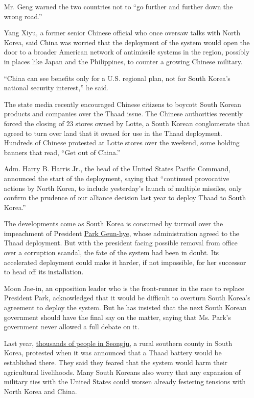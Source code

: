 Mr. Geng warned the two countries not to ``go further and further down
the wrong road.''

Yang Xiyu, a former senior Chinese official who once oversaw talks with
North Korea, said China was worried that the deployment of the system
would open the door to a broader American network of antimissile systems
in the region, possibly in places like Japan and the Philippines, to
counter a growing Chinese military.

``China can see benefits only for a U.S. regional plan, not for South
Korea's national security interest,'' he said.

The state media recently encouraged Chinese citizens to boycott South
Korean products and companies over the Thaad issue. The Chinese
authorities recently forced the closing of 23 stores owned by Lotte, a
South Korean conglomerate that agreed to turn over land that it owned
for use in the Thaad deployment. Hundreds of Chinese protested at Lotte
stores over the weekend, some holding banners that read, ``Get out of
China.''

Adm. Harry B. Harris Jr., the head of the United States Pacific Command,
announced the start of the deployment, saying that ``continued
provocative actions by North Korea, to include yesterday's launch of
multiple missiles, only confirm the prudence of our alliance decision
last year to deploy Thaad to South Korea.''

The developments come as South Korea is consumed by turmoil over the
impeachment of President
\href{http://topics.nytimes3xbfgragh.onion/top/reference/timestopics/people/p/park_geunhye/index.html?inline=nyt-per}{Park
Geun-hye}, whose administration agreed to the Thaad deployment. But with
the president facing possible removal from office over a corruption
scandal, the fate of the system had been in doubt. Its accelerated
deployment could make it harder, if not impossible, for her successor to
head off its installation.

Moon Jae-in, an opposition leader who is the front-runner in the race to
replace President Park, acknowledged that it would be difficult to
overturn South Korea's agreement to deploy the system. But he has
insisted that the next South Korean government should have the final say
on the matter, saying that Ms. Park's government never allowed a full
debate on it.

Last year,
\href{https://www.nytimes3xbfgragh.onion/2016/07/14/world/asia/south-korea-thaad-us.html}{thousands
of people in Seongju}, a rural southern county in South Korea, protested
when it was announced that a Thaad battery would be established there.
They said they feared that the system would harm their agricultural
livelihoods. Many South Koreans also worry that any expansion of
military ties with the United States could worsen already festering
tensions with North Korea and China.

